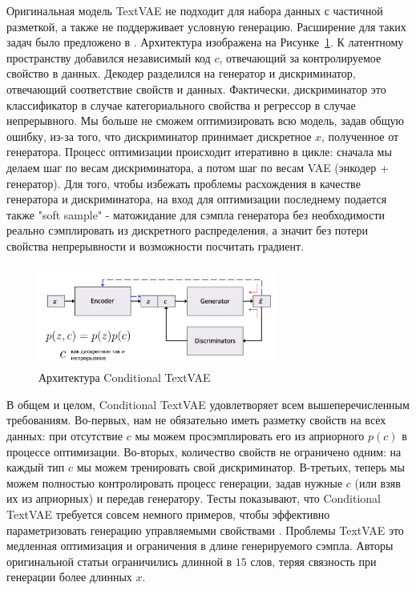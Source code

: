 \documentclass{spbau-diploma}
\begin{document}
Оригинальная модель TextVAE не подходит для набора данных с частичной разметкой, 
а также не поддерживает условную генерацию. Расширение для таких задач было 
предложено в \cite{text_cvae}. Архитектура изображена на 
Рисунке~\ref{cvae}. К латентному пространству добавился независимый код $c$,
отвечающий за контролируемое свойство в данных. Декодер разделился на генератор 
и дискриминатор, отвечающий соответствие свойств и данных. Фактически, 
дискриминатор это классификатор в случае категориального свойства и регрессор в
случае непрерывного. Мы больше не сможем оптимизировать всю модель, задав общую
ошибку, из-за того, что дискриминатор принимает дискретное $x$, полученное от
генератора. Процесс оптимизации происходит итеративно в цикле: сначала мы 
делаем шаг по весам дискриминатора, а потом шаг по весам VAE (энкодер + 
генератор). Для того, чтобы избежать проблемы расхождения в качестве генератора
и дискриминатора, на вход для оптимизации последнему подается также 
"soft sample" - матожидание для сэмпла генератора без необходимости
реально сэмплировать из дискретного распределения, а значит без потери свойства
непрерывности и возможности посчитать градиент.

\begin{figure}[H]
\centering
\includegraphics[width=0.7\textwidth]{images/cvae.png}
\caption{Архитектура Conditional TextVAE~\cite{text_cvae}}
\label{cvae}
\end{figure}

В общем и целом, Conditional TextVAE удовлетворяет всем вышеперечисленным 
требованиям. Во-первых, нам не обязательно иметь разметку свойств на всех 
данных: при отсутствие $c$ мы можем просэмплировать его из априорного $p(c)$ в
процессе оптимизации. Во-вторых, количество свойств не ограничено одним: на 
каждый тип $c$ мы можем тренировать свой дискриминатор. В-третьих, теперь мы
можем полностью контролировать процесс генерации, задав нужные $c$ (или взяв
их из априорных) и передав генератору. Тесты показывают, что Conditional TextVAE
требуется совсем немного примеров, чтобы эффективно параметризовать генерацию
управляемыми свойствами \cite{text_cvae}. Проблемы TextVAE это медленная
оптимизация и ограничения в длине генерируемого сэмпла. Авторы оригинальной 
статьи ограничились длинной в $15$ слов, теряя связность при генерации более
длинных $x$.
\end{document}
